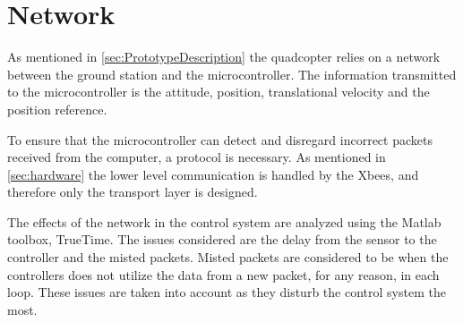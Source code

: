 \chapter{Network} \label{ch:Network}

As mentioned in \autoref{sec:PrototypeDescription} the quadcopter relies on a network between the ground station and the microcontroller. The information transmitted to the microcontroller is the attitude, position, translational velocity and the position reference.

To ensure that the microcontroller can detect and disregard incorrect packets received from the computer, a protocol is necessary. As mentioned in \autoref{sec:hardware} the lower level communication is handled by the Xbees, and therefore only the transport layer is designed.


The effects of the network in the control system are analyzed using the Matlab toolbox, TrueTime. The issues considered are the delay from the sensor to the controller and the misted packets. Misted packets are considered to be when the controllers does not utilize the data from a new packet, for any reason, in each loop. These issues are taken into account as they disturb the control system the most.
